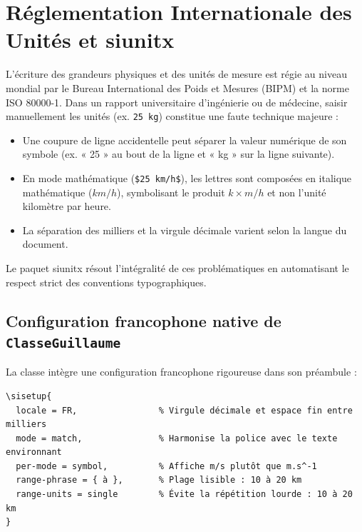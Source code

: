 \section{Réglementation Internationale des Unités et \textsf{siunitx}}
\label{sec:unites_siunitx}

L'écriture des grandeurs physiques et des unités de mesure est régie au niveau mondial par le Bureau International des Poids et Mesures (BIPM) et la norme ISO 80000-1.
Dans un rapport universitaire d'ingénierie ou de médecine, saisir manuellement les unités (ex. \texttt{25 kg}) constitue une faute technique majeure :
\begin{itemize}
  \item Une coupure de ligne accidentelle peut séparer la valeur numérique de son symbole (ex. « 25 » au bout de la ligne et « kg » sur la ligne suivante).
  \item En mode mathématique (\texttt{\$25 km/h\$}), les lettres sont composées en italique mathématique ($km/h$), symbolisant le produit $k \times m / h$ et non l'unité kilomètre par heure.
  \item La séparation des milliers et la virgule décimale varient selon la langue du document.
\end{itemize}

Le paquet \textsf{siunitx} résout l'intégralité de ces problématiques en automatisant le respect strict des conventions typographiques.

\subsection{Configuration francophone native de \texttt{ClasseGuillaume}}
\label{subsec:config_siunitx}

La classe intègre une configuration francophone rigoureuse dans son préambule :
\begin{verbatim}
\sisetup{
  locale = FR,                % Virgule décimale et espace fin entre milliers
  mode = match,               % Harmonise la police avec le texte environnant
  per-mode = symbol,          % Affiche m/s plutôt que m.s^-1
  range-phrase = { à },       % Plage lisible : 10 à 20 km
  range-units = single        % Évite la répétition lourde : 10 à 20 km
}
\end{verbatim}

